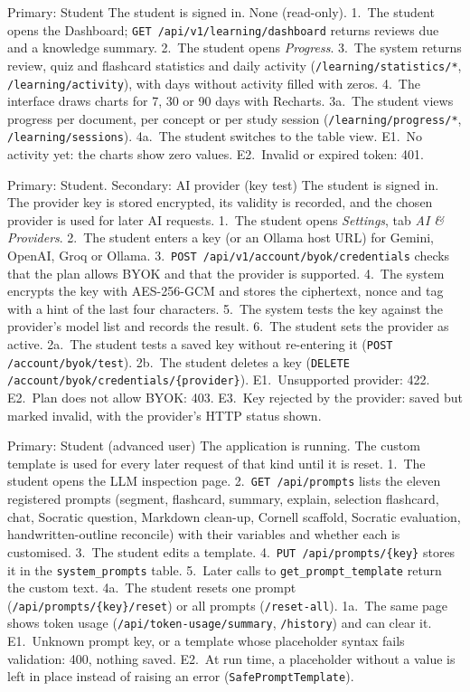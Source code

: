 {Primary: Student}
{The student is signed in.}
{None (read-only).}
{1.~The student opens the Dashboard; \texttt{GET /api/v1/learning/dashboard} returns reviews due
and a knowledge summary. 2.~The student opens \emph{Progress}. 3.~The system returns review,
quiz and flashcard statistics and daily activity (\texttt{/learning/statistics/*},
\texttt{/learning/activity}), with days without activity filled with zeros. 4.~The interface
draws charts for 7, 30 or 90 days with Recharts.}
{3a.~The student views progress per document, per concept or per study session
(\texttt{/learning/progress/*}, \texttt{/learning/sessions}). 4a.~The student switches to the
table view.}
{E1.~No activity yet: the charts show zero values. E2.~Invalid or expired token: 401.}

{Primary: Student. Secondary: AI provider (key test)}
{The student is signed in.}
{The provider key is stored encrypted, its validity is recorded, and the chosen provider is
used for later AI requests.}
{1.~The student opens \emph{Settings}, tab \emph{AI \& Providers}. 2.~The student enters a key
(or an Ollama host URL) for Gemini, OpenAI, Groq or Ollama. 3.~\texttt{POST /api/v1/account/byok/credentials}
checks that the plan allows BYOK and that the provider is supported. 4.~The system encrypts the
key with AES-256-GCM and stores the ciphertext, nonce and tag with a hint of the last four
characters. 5.~The system tests the key against the provider's model list and records the
result. 6.~The student sets the provider as active.}
{2a.~The student tests a saved key without re-entering it (\texttt{POST /account/byok/test}).
2b.~The student deletes a key (\texttt{DELETE /account/byok/credentials/\{provider\}}).}
{E1.~Unsupported provider: 422. E2.~Plan does not allow BYOK: 403. E3.~Key rejected by the
provider: saved but marked invalid, with the provider's HTTP status shown.}

{Primary: Student (advanced user)}
{The application is running.}
{The custom template is used for every later request of that kind until it is reset.}
{1.~The student opens the LLM inspection page. 2.~\texttt{GET /api/prompts} lists the eleven
registered prompts (segment, flashcard, summary, explain, selection flashcard, chat, Socratic
question, Markdown clean-up, Cornell scaffold, Socratic evaluation, handwritten-outline
reconcile) with their variables and whether each is customised. 3.~The student edits a template.
4.~\texttt{PUT /api/prompts/\{key\}} stores it in the \texttt{system\_prompts} table. 5.~Later
calls to \texttt{get\_prompt\_template} return the custom text.}
{4a.~The student resets one prompt (\texttt{/api/prompts/\{key\}/reset}) or all prompts
(\texttt{/reset-all}). 1a.~The same page shows token usage (\texttt{/api/token-usage/summary},
\texttt{/history}) and can clear it.}
{E1.~Unknown prompt key, or a template whose placeholder syntax fails validation: 400, nothing
saved. E2.~At run time, a placeholder without a value is left in place instead of raising an
error (\texttt{SafePromptTemplate}).}

